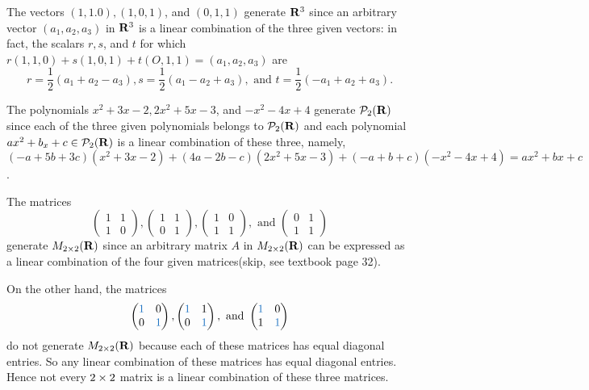 \begin{example} \label{example 1.4.3}
The vectors \((1, 1. 0), (1, 0, 1)\), and \((0, 1, 1)\) generate \(\mathbf{R}^3\) since an arbitrary vector \((a_1, a_2, a_3)\) in \(\mathbf{R}^3\) is a linear combination of the three given vectors:
in fact, the scalars \(r, s\), and \(t\) for which \(r(1, 1, 0) + s(1, 0, 1) + t(O, 1, 1) = (a_1, a_2, a_3)\)
are
\[
    r = \frac1{2}(a_1 + a_2 - a_3), s = \frac1{2}(a_1 - a_2 + a_3), \text{ and } t = \frac1{2}(-a_1 + a_2 + a_3).
\]
\end{example}

\begin{example} \label{example 1.4.4}
The polynomials \(x^2 + 3x - 2, 2x^2 + 5x - 3\), and \(-x^2 - 4x + 4\) generate \(\mathcal{P}_2(\mathbf{R})\) since each of the three given polynomials belongs to \(\mathcal{P}_2(\mathbf{R})\)
and each polynomial \(ax^2 + b_x + c \in \mathcal{P}_2(\mathbf{R})\) is a linear combination of these three,
namely, \((-a + 5b + 3c)(x^2 + 3x - 2) + (4a - 2b - c)(2x^2 + 5x - 3) + (-a + b + c)(-x^2 - 4x + 4) = ax^2 + bx +c\). 
\end{example}

\begin{example} \label{example 1.4.5}
The matrices
\[
\begin{pmatrix}
  1 & 1 \\
  1 & 0
\end{pmatrix},
\begin{pmatrix}
  1 & 1 \\
  0 & 1
\end{pmatrix},
\begin{pmatrix}
  1 & 0 \\
  1 & 1
\end{pmatrix}, \text{ and }
\begin{pmatrix}
  0 & 1 \\
  1 & 1
\end{pmatrix}
\]
generate \(M_{2 \times 2}(\mathbf{R})\) since an arbitrary matrix \(A\) in \(M_{2 \times 2}(\mathbf{R})\) can be expressed as a linear combination of the four given matrices(skip, see textbook page 32).

On the other hand, the matrices
\[
\begin{pmatrix}
  \BLUE{1} &       0 \\
        0  & \BLUE{1}
\end{pmatrix},
\begin{pmatrix}
  \BLUE{1} &       1 \\
        0  & \BLUE{1}
\end{pmatrix}, \text{ and }
\begin{pmatrix}
  \BLUE{1} &       0 \\
        1  & \BLUE{1}
\end{pmatrix}
\]
do not generate \(M_{2 \times 2}(\mathbf{R})\) because each of these matrices has equal diagonal entries.
So any linear combination of these matrices has equal diagonal entries.
Hence not every \(2 \times 2\) matrix is a linear combination of these three matrices.
\end{example}

